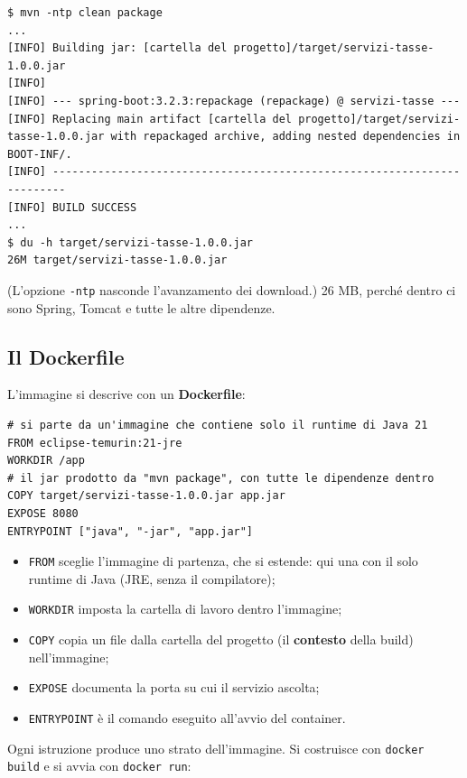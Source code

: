 \begin{lstlisting}[style=shell, name=Terminale]
$ mvn -ntp clean package
...
[INFO] Building jar: [cartella del progetto]/target/servizi-tasse-1.0.0.jar
[INFO]
[INFO] --- spring-boot:3.2.3:repackage (repackage) @ servizi-tasse ---
[INFO] Replacing main artifact [cartella del progetto]/target/servizi-tasse-1.0.0.jar with repackaged archive, adding nested dependencies in BOOT-INF/.
[INFO] ------------------------------------------------------------------------
[INFO] BUILD SUCCESS
...
$ du -h target/servizi-tasse-1.0.0.jar
26M	target/servizi-tasse-1.0.0.jar
\end{lstlisting}

(L'opzione \texttt{-ntp} nasconde l'avanzamento dei download.) 26 MB, perché dentro ci sono Spring, Tomcat e tutte le
altre dipendenze.

\subsection{Il Dockerfile}

L'immagine si descrive con un \textbf{Dockerfile}:

\begin{lstlisting}[style=docker, name=servizi-tasse/Dockerfile]
# si parte da un'immagine che contiene solo il runtime di Java 21
FROM eclipse-temurin:21-jre
WORKDIR /app
# il jar prodotto da "mvn package", con tutte le dipendenze dentro
COPY target/servizi-tasse-1.0.0.jar app.jar
EXPOSE 8080
ENTRYPOINT ["java", "-jar", "app.jar"]
\end{lstlisting}

\begin{itemize}
  \item \texttt{FROM} sceglie l'immagine di partenza, che si estende: qui una con il solo runtime di Java (JRE, senza il
        compilatore);
  \item \texttt{WORKDIR} imposta la cartella di lavoro dentro l'immagine;
  \item \texttt{COPY} copia un file dalla cartella del progetto (il \textbf{contesto} della build) nell'immagine;
  \item \texttt{EXPOSE} documenta la porta su cui il servizio ascolta;
  \item \texttt{ENTRYPOINT} è il comando eseguito all'avvio del container.
\end{itemize}

Ogni istruzione produce uno strato dell'immagine. Si costruisce con \texttt{docker build} e si avvia con
\texttt{docker run}:

